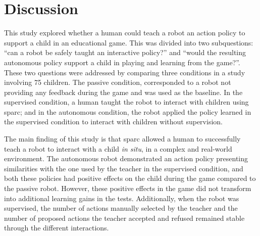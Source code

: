 %
%


\section{Discussion} \label{sec:tutoring_discussion}

This study explored whether a human could teach a robot an action policy to support a child in an educational game. This was divided into two subquestions: ``can a robot be safely taught an interactive policy?'' and ``would the resulting autonomous policy support a child in playing and learning from the game?''. These two questions were addressed by comparing three conditions in a study involving 75 children. The passive condition, corresponded to a robot not providing any feedback during the game and was used as the baseline. In the supervised condition, a human taught the robot to interact with children using \gls{sparc}; and in the autonomous condition, the robot applied the policy learned in the supervised condition to interact with children without supervision.

The main finding of this study is that \gls{sparc} allowed a human to successfully teach a robot to interact with a child \textit{in situ}, in a complex and real-world environment. The autonomous robot demonstrated an action policy presenting similarities with the one used by the teacher in the supervised condition, and both these policies had positive effects on the child during the game compared to the passive robot. However, these positive effects in the game did not transform into additional learning gains in the tests. Additionally, when the robot was supervised, the number of actions manually selected by the teacher and the number of proposed actions the teacher accepted and refused remained stable through the different interactions.


